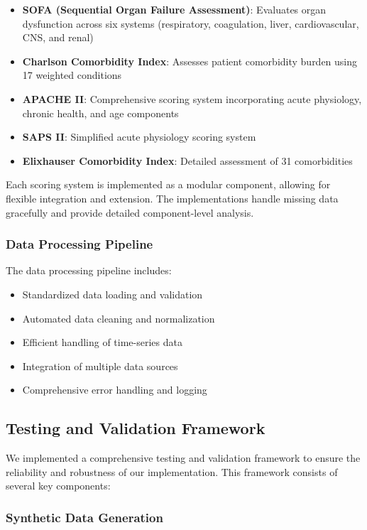 \documentclass[12pt]{article}
\begin{document}
\begin{itemize}
    \item \textbf{SOFA (Sequential Organ Failure Assessment)}: Evaluates organ dysfunction across six systems (respiratory, coagulation, liver, cardiovascular, CNS, and renal)
    \item \textbf{Charlson Comorbidity Index}: Assesses patient comorbidity burden using 17 weighted conditions
    \item \textbf{APACHE II}: Comprehensive scoring system incorporating acute physiology, chronic health, and age components
    \item \textbf{SAPS II}: Simplified acute physiology scoring system
    \item \textbf{Elixhauser Comorbidity Index}: Detailed assessment of 31 comorbidities
\end{itemize}

Each scoring system is implemented as a modular component, allowing for flexible integration and extension. The implementations handle missing data gracefully and provide detailed component-level analysis.

\subsubsection{Data Processing Pipeline}

The data processing pipeline includes:
\begin{itemize}
    \item Standardized data loading and validation
    \item Automated data cleaning and normalization
    \item Efficient handling of time-series data
    \item Integration of multiple data sources
    \item Comprehensive error handling and logging
\end{itemize}

\subsection{Testing and Validation Framework}

We implemented a comprehensive testing and validation framework to ensure the reliability and robustness of our implementation. This framework consists of several key components:

\subsubsection{Synthetic Data Generation}
\end{document}
